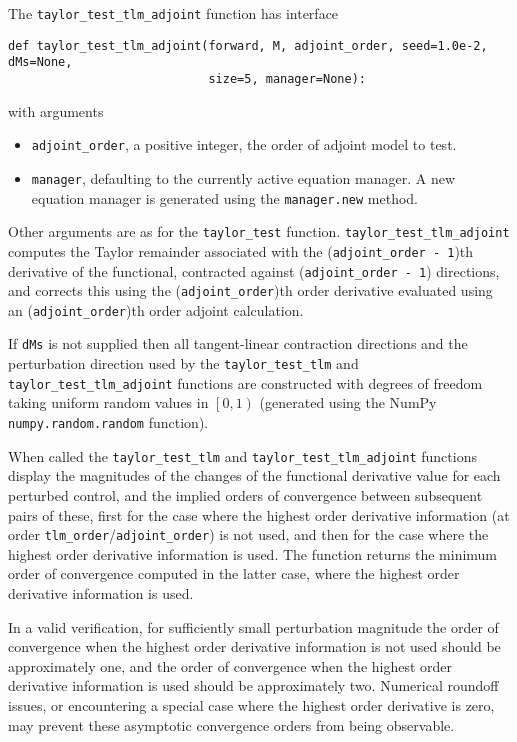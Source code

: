 \documentclass[11pt]{article}
\begin{document}
The \texttt{taylor\_test\_tlm\_adjoint} function has interface
\begin{lstlisting}
def taylor_test_tlm_adjoint(forward, M, adjoint_order, seed=1.0e-2, dMs=None,
                            size=5, manager=None):
\end{lstlisting}
with arguments
\begin{itemize}
  \item \texttt{adjoint\_order}, a positive integer, the order of adjoint model
    to test.
  \item \texttt{manager}, defaulting to the currently active equation manager.
    A new equation manager is generated using the \texttt{manager.new} method.
\end{itemize}
Other arguments are as for the \texttt{taylor\_test} function.
\texttt{taylor\_test\_tlm\_adjoint} computes the Taylor remainder associated
with the (\texttt{adjoint\_order - 1})th derivative of the functional,
contracted against (\texttt{adjoint\_order - 1}) directions, and corrects this
using the (\texttt{adjoint\_order})th order derivative evaluated using an
(\texttt{adjoint\_order})th order adjoint calculation.

If \texttt{dMs} is not supplied then all tangent-linear contraction directions
and the perturbation direction used by the \texttt{taylor\_test\_tlm} and
\texttt{taylor\_test\_tlm\_adjoint} functions are constructed with degrees of
freedom taking uniform random values in $\left[ 0, 1 \right)$ (generated using
the NumPy \texttt{numpy.random.random} function).

When called the \texttt{taylor\_test\_tlm} and
\texttt{taylor\_test\_tlm\_adjoint} functions display the magnitudes of the
changes of the functional derivative value for each perturbed control, and the
implied orders of convergence between subsequent pairs of these, first for the
case where the highest order derivative information (at order
\texttt{tlm\_order}/\texttt{adjoint\_order}) is not used, and then for the case
where the highest order derivative information is used. The function returns
the minimum order of convergence computed in the latter case, where the highest
order derivative information is used.

In a valid verification, for sufficiently small perturbation magnitude the
order of convergence when the highest order derivative information is not used
should be approximately one, and the order of convergence when the highest
order derivative information is used should be approximately two. Numerical
roundoff issues, or encountering a special case where the highest order
derivative is zero, may prevent these asymptotic convergence orders from being
observable.
\end{document}
